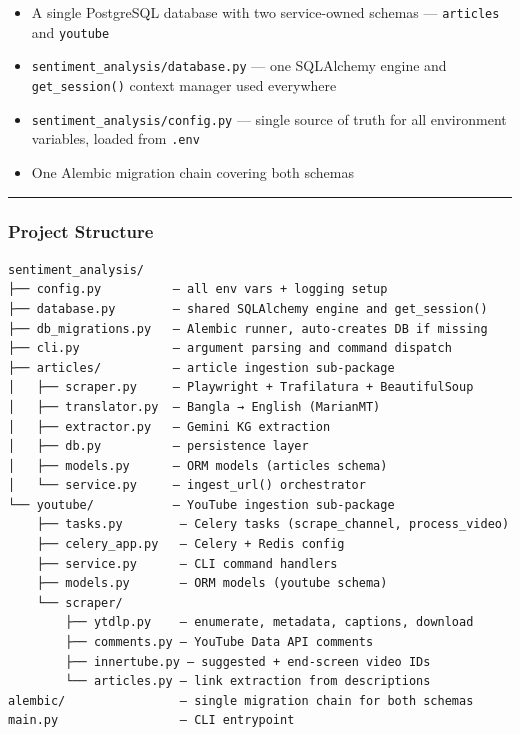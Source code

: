 \documentclass[
]{article}
\providecommand{\tightlist}{%
  \setlength{\itemsep}{0pt}\setlength{\parskip}{0pt}}
\begin{document}
\begin{itemize}
\tightlist
\item
  A single PostgreSQL database with two service-owned schemas ---
  \texttt{articles} and \texttt{youtube}
\item
  \texttt{sentiment\_analysis/database.py} --- one SQLAlchemy engine and
  \texttt{get\_session()} context manager used everywhere
\item
  \texttt{sentiment\_analysis/config.py} --- single source of truth for
  all environment variables, loaded from \texttt{.env}
\item
  One Alembic migration chain covering both schemas
\end{itemize}

\begin{center}\rule{0.5\linewidth}{0.5pt}\end{center}

\subsubsection{Project Structure}\label{project-structure}

\begin{verbatim}
sentiment_analysis/
├── config.py          — all env vars + logging setup
├── database.py        — shared SQLAlchemy engine and get_session()
├── db_migrations.py   — Alembic runner, auto-creates DB if missing
├── cli.py             — argument parsing and command dispatch
├── articles/          — article ingestion sub-package
│   ├── scraper.py     — Playwright + Trafilatura + BeautifulSoup
│   ├── translator.py  — Bangla → English (MarianMT)
│   ├── extractor.py   — Gemini KG extraction
│   ├── db.py          — persistence layer
│   ├── models.py      — ORM models (articles schema)
│   └── service.py     — ingest_url() orchestrator
└── youtube/           — YouTube ingestion sub-package
    ├── tasks.py        — Celery tasks (scrape_channel, process_video)
    ├── celery_app.py   — Celery + Redis config
    ├── service.py      — CLI command handlers
    ├── models.py       — ORM models (youtube schema)
    └── scraper/
        ├── ytdlp.py    — enumerate, metadata, captions, download
        ├── comments.py — YouTube Data API comments
        ├── innertube.py — suggested + end-screen video IDs
        └── articles.py — link extraction from descriptions
alembic/                — single migration chain for both schemas
main.py                 — CLI entrypoint
\end{verbatim}
\end{document}
